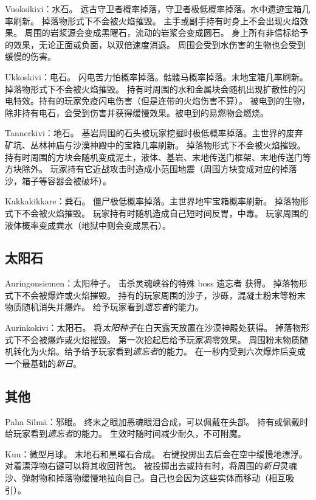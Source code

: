 \documentclass[11pt]{article}
\begin{document}
    Vuoksikivi：水石。
    远古守卫者概率掉落，守卫者极低概率掉落。水中遗迹宝箱几率刷新。
    掉落物形式下不会被火焰摧毁。
    主手或副手持有时身上不会出现火焰效果。
    周围的岩浆源会变成黑曜石，流动的岩浆会变成圆石。
    身上所有非信标给予的效果，无论正面或负面，以双倍速度消退。
    周围会受到水伤害的生物也会受到缓慢的伤害。

    Ukkoskivi：电石。
    闪电苦力怕概率掉落。骷髅马概率掉落。末地宝箱几率刷新。
    掉落物形式下不会被火焰摧毁。
    持有时周围的水和金属块会随机出现扩散性的闪电特效。持有的玩家免疫闪电伤害（但是连带的火焰伤害不算）。
    被电到的生物，除非持有电石，会受到伤害并获得缓慢效果。被电到的易燃物会燃烧。

    Tannerkivi：地石。
    基岩周围的石头被玩家挖掘时极低概率掉落。主世界的废弃矿坑、丛林神庙与沙漠神殿中的宝箱几率刷新。
    掉落物形式下不会被火焰摧毁。
    持有时周围的方块会随机变成泥土，液体、基岩、末地传送门框架、末地传送门等方块除外。
    玩家持有它近战攻击时造成小范围地震（周围方块变成对应的掉落沙，箱子等容器会被破坏）。

    Kakkakikkare：粪石。
    僵尸极低概率掉落。主世界地牢宝箱概率刷新。
    掉落物形式下不会被火焰摧毁。
    玩家持有时随机造成自己短时间反胃，中毒。
    玩家周围的液体概率变成粪水（地狱中则会变成黑石）。

    \subsection{太阳石}\label{subsec:solar-stone}
    Auringonsiemen：太阳种子。
    击杀灵魂峡谷的特殊 boss 遗忘者 获得。
    掉落物形式下不会被爆炸或火焰摧毁。
    持有的玩家周围的沙子，沙砾，混凝土粉末等粉末物质随机消失并爆炸。
    给予玩家看到\textit{遗忘者}的能力。

    Aurinkokivi：太阳石。
    将\textit{太阳种子}在白天露天放置在沙漠神殿处获得。
    掉落物形式下不会被爆炸或火焰摧毁。
    第一次拾起后给予玩家凋零效果。
    周围粉末物质随机转化为火焰。给予给予玩家看到\textit{遗忘者}的能力。
    在一秒内受到六次爆炸后变成一个最基础的\textit{新日}。

    \subsection{其他}\label{subsec:others}
    Paha Silmä：邪眼。
    终末之眼加恶魂眼泪合成，可以佩戴在头部。
    持有或佩戴时给玩家看到\textit{遗忘者}的能力。
    生效时随时间减少耐久，不可附魔。

    Kuu：微型月球。
    末地石和黑曜石合成。
    右键投掷出去后会在空中缓慢地漂浮。对着漂浮物右键可以将其收回背包。
    被投掷出去或持有时，将周围的\textit{新日}灵魂沙、弹射物和掉落物缓慢地拉向自己。自己也会因为这些实体而移动（相互吸引）。
\end{document}
